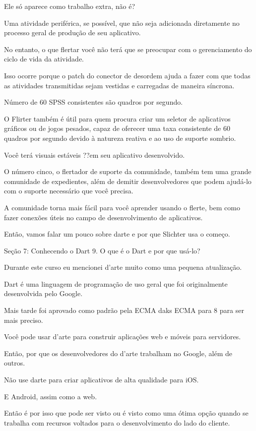 Ele só aparece como trabalho extra, não é?

Uma atividade periférica, se possível, que não seja adicionada diretamente no processo geral de produção de seu aplicativo.

No entanto, o que flertar você não terá que se preocupar com o gerenciamento do ciclo de vida da atividade.

Isso ocorre porque o patch do conector de desordem ajuda a fazer com que todas as atividades transmitidas sejam vestidas e carregadas de maneira síncrona.

Número de 60 SPSS consistentes são quadros por segundo.

O Flirter também é útil para quem procura criar um seletor de aplicativos gráficos ou de jogos pesados, capaz de oferecer uma taxa consistente de 60 quadros por segundo devido à natureza reativa e ao uso de suporte sombrio.

Você terá visuais estáveis ??em seu aplicativo desenvolvido.

O número cinco, o flertador de suporte da comunidade, também tem uma grande comunidade de expedientes, além de demitir desenvolvedores que podem ajudá-lo com o suporte necessário que você precisa.

A comunidade torna mais fácil para você aprender usando o flerte, bem como fazer conexões úteis no campo de desenvolvimento de aplicativos.

Então, vamos falar um pouco sobre darte e por que Slichter usa o começo.

Seção 7: Conhecendo o Dart
9. O que é o Dart e por que usá-lo?

Durante este curso eu mencionei d'arte muito como uma pequena atualização.

Dart é uma linguagem de programação de uso geral que foi originalmente desenvolvida pelo Google.

Mais tarde foi aprovado como padrão pela ECMA daks ECMA para 8 para ser mais preciso.

Você pode usar d'arte para construir aplicações web e móveis para servidores.

Então, por que os desenvolvedores do d'arte trabalham no Google, além de outros.

Não use darte para criar aplicativos de alta qualidade para iOS.

E Android, assim como a web.

Então é por isso que pode ser visto ou é visto como uma ótima opção quando se trabalha com recursos voltados para o desenvolvimento do lado do cliente.

